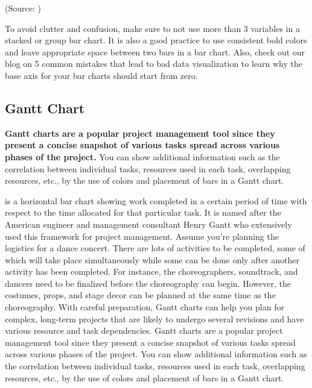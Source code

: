 \documentclass[]{book}
\theoremstyle{definition}
\theoremstyle{definition}
\theoremstyle{definition}
\theoremstyle{remark}
\begin{document}
(Source: \citep{aya-time-series})

To avoid clutter and confusion, make sure to not use more than 3
variables in a stacked or group bar chart. It is also a good practice to
use consistent bold colors and leave appropriate space between two bars
in a bar chart. Also, check out our blog on 5 common mistakes that lead
to bad data visualization to learn why the base axis for your bar charts
should start from zero.

\subsection{Gantt Chart}\label{gantt-chart}

\textbf{Gantt charts are a popular project management tool since they
present a concise snapshot of various tasks spread across various phases
of the project.} You can show additional information such as the
correlation between individual tasks, resources used in each task,
overlapping resources, etc., by the use of colors and placement of bars
in a Gantt chart.

is a horizontal bar chart showing work completed in a certain period of
time with respect to the time allocated for that particular task. It is
named after the American engineer and management consultant Henry Gantt
who extensively used this framework for project management. Assume
you're planning the logistics for a dance concert. There are lots of
activities to be completed, some of which will take place simultaneously
while some can be done only after another activity has been completed.
For instance, the choreographers, soundtrack, and dancers need to be
finalized before the choreography can begin. However, the costumes,
props, and stage decor can be planned at the same time as the
choreography. With careful preparation, Gantt charts can help you plan
for complex, long-term projects that are likely to undergo several
revisions and have various resource and task dependencies. Gantt charts
are a popular project management tool since they present a concise
snapshot of various tasks spread across various phases of the project.
You can show additional information such as the correlation between
individual tasks, resources used in each task, overlapping resources,
etc., by the use of colors and placement of bars in a Gantt chart.
\end{document}
